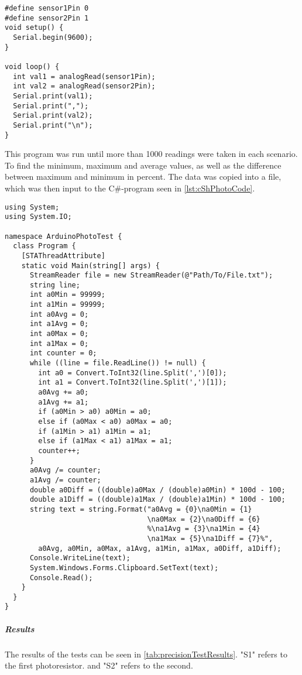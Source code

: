 \lstset{language=C}
\begin{lstlisting}[label = lst:arduinoPhotoCode, caption = Arduino program for photoresistor tests]
#define sensor1Pin 0
#define sensor2Pin 1
void setup() {
  Serial.begin(9600);
}

void loop() {
  int val1 = analogRead(sensor1Pin);
  int val2 = analogRead(sensor2Pin);
  Serial.print(val1);
  Serial.print(",");
  Serial.print(val2);
  Serial.print("\n");
}
\end{lstlisting}

This program was run until more than 1000 readings were taken in each scenario.
To find the minimum, maximum and average values, as well as the difference between maximum and minimum in percent. The data was copied into a file, which was then input to the C\#-program seen in \cref{lst:cShPhotoCode}.

\lstset{language=[Sharp]C}
\begin{lstlisting}[label = lst:cShPhotoCode, caption = C\# data processing code, showstringspaces=false]
using System;
using System.IO;

namespace ArduinoPhotoTest {
  class Program {
    [STAThreadAttribute]
    static void Main(string[] args) {
      StreamReader file = new StreamReader(@"Path/To/File.txt");
      string line;
      int a0Min = 99999;
      int a1Min = 99999;
      int a0Avg = 0;
      int a1Avg = 0;
      int a0Max = 0;
      int a1Max = 0;
      int counter = 0;
      while ((line = file.ReadLine()) != null) {
        int a0 = Convert.ToInt32(line.Split(',')[0]);
        int a1 = Convert.ToInt32(line.Split(',')[1]);
        a0Avg += a0;
        a1Avg += a1;
        if (a0Min > a0) a0Min = a0;
        else if (a0Max < a0) a0Max = a0;
        if (a1Min > a1) a1Min = a1;
        else if (a1Max < a1) a1Max = a1;
        counter++;
      }
      a0Avg /= counter;
      a1Avg /= counter;
      double a0Diff = ((double)a0Max / (double)a0Min) * 100d - 100;
      double a1Diff = ((double)a1Max / (double)a1Min) * 100d - 100;
      string text = string.Format("a0Avg = {0}\na0Min = {1}
                                  \na0Max = {2}\na0Diff = {6}
                                  %\na1Avg = {3}\na1Min = {4}
                                  \na1Max = {5}\na1Diff = {7}%",
        a0Avg, a0Min, a0Max, a1Avg, a1Min, a1Max, a0Diff, a1Diff);
      Console.WriteLine(text);
      System.Windows.Forms.Clipboard.SetText(text);
      Console.Read();
    }
  }
}
\end{lstlisting}
\subparagraph{Results}
The results of the tests can be seen in \cref{tab:precisionTestResults}. "S1" refers to the first photoresistor. and "S2" refers to the second.

